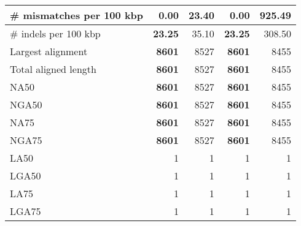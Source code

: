\documentclass[12pt,a4paper]{article}
\begin{document}
\begin{table}[ht]
\begin{center}
\begin{tabular}{|l*{4}{|r}|}
\# mismatches per 100 kbp & {\bf 0.00} & 23.40 & {\bf 0.00} & 925.49 \\ \hline
\# indels per 100 kbp & {\bf 23.25} & 35.10 & {\bf 23.25} & 308.50 \\ \hline
Largest alignment & {\bf 8601} & 8527 & {\bf 8601} & 8455 \\ \hline
Total aligned length & {\bf 8601} & 8527 & {\bf 8601} & 8455 \\ \hline
NA50 & {\bf 8601} & 8527 & {\bf 8601} & 8455 \\ \hline
NGA50 & {\bf 8601} & 8527 & {\bf 8601} & 8455 \\ \hline
NA75 & {\bf 8601} & 8527 & {\bf 8601} & 8455 \\ \hline
NGA75 & {\bf 8601} & 8527 & {\bf 8601} & 8455 \\ \hline
LA50 & 1 & 1 & 1 & 1 \\ \hline
LGA50 & 1 & 1 & 1 & 1 \\ \hline
LA75 & 1 & 1 & 1 & 1 \\ \hline
LGA75 & 1 & 1 & 1 & 1 \\ \hline
\end{tabular}
\end{center}
\end{table}
\end{document}
